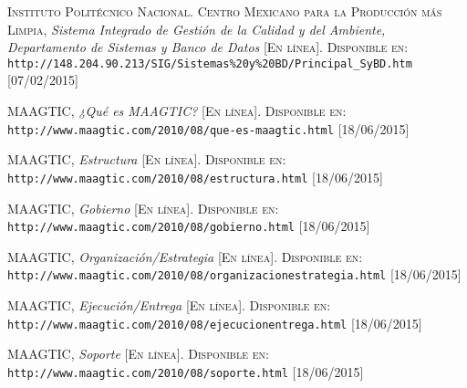 \begin{thebibliography}{X}
		\textsc{Instituto Politécnico Nacional. Centro Mexicano para la Producción más Limpia},
		\textit{Sistema Integrado de Gestión de la Calidad y del Ambiente, Departamento de Sistemas y Banco de Datos}
		\textsc{[En línea]. Disponible en:}
		\texttt{http://148.204.90.213/SIG/Sistemas\%20y\%20BD/Principal\_SyBD.htm}
		\textsc{[07/02/2015]}
		
		\textsc{MAAGTIC},
		\textit{¿Qué es MAAGTIC?}
		\textsc{[En línea]. Disponible en:}
		\texttt{http://www.maagtic.com/2010/08/que-es-maagtic.html}
		\textsc{[18/06/2015]}
		
		\textsc{MAAGTIC},
		\textit{Estructura}
		\textsc{[En línea]. Disponible en:}
		\texttt{http://www.maagtic.com/2010/08/estructura.html}
		\textsc{[18/06/2015]}
		
		\textsc{MAAGTIC},
		\textit{Gobierno}
		\textsc{[En línea]. Disponible en:}
		\texttt{http://www.maagtic.com/2010/08/gobierno.html}
		\textsc{[18/06/2015]}

		\textsc{MAAGTIC},
		\textit{Organización/Estrategia}
		\textsc{[En línea]. Disponible en:}
		\texttt{http://www.maagtic.com/2010/08/organizacionestrategia.html}
		\textsc{[18/06/2015]}

		\textsc{MAAGTIC},
		\textit{Ejecución/Entrega}
		\textsc{[En línea]. Disponible en:}
		\texttt{http://www.maagtic.com/2010/08/ejecucionentrega.html}
		\textsc{[18/06/2015]}
		
		\textsc{MAAGTIC},
		\textit{Soporte}
		\textsc{[En línea]. Disponible en:}
		\texttt{http://www.maagtic.com/2010/08/soporte.html}
		\textsc{[18/06/2015]}
		
\end{thebibliography}
